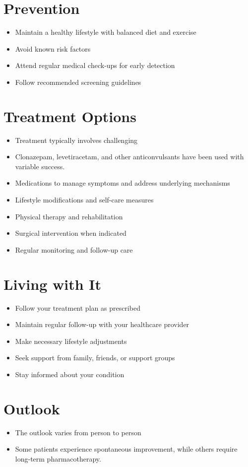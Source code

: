 \section{Prevention}
\begin{itemize}[noitemsep]
  \item Maintain a healthy lifestyle with balanced diet and exercise
  \item Avoid known risk factors
  \item Attend regular medical check-ups for early detection
  \item Follow recommended screening guidelines
\end{itemize}
\section{Treatment Options}
\begin{itemize}[noitemsep]
  \item Treatment typically involves challenging
  \item Clonazepam, levetiracetam, and other anticonvulsants have been used with variable success.
  \item Medications to manage symptoms and address underlying mechanisms
  \item Lifestyle modifications and self-care measures
  \item Physical therapy and rehabilitation
  \item Surgical intervention when indicated
  \item Regular monitoring and follow-up care
\end{itemize}
\section{Living with It}
\begin{itemize}[noitemsep]
  \item Follow your treatment plan as prescribed
  \item Maintain regular follow-up with your healthcare provider
  \item Make necessary lifestyle adjustments
  \item Seek support from family, friends, or support groups
  \item Stay informed about your condition
\end{itemize}
\section{Outlook}
\begin{itemize}[noitemsep]
  \item The outlook varies from person to person
  \item Some patients experience spontaneous improvement, while others require long-term pharmacotherapy.
\end{itemize}
